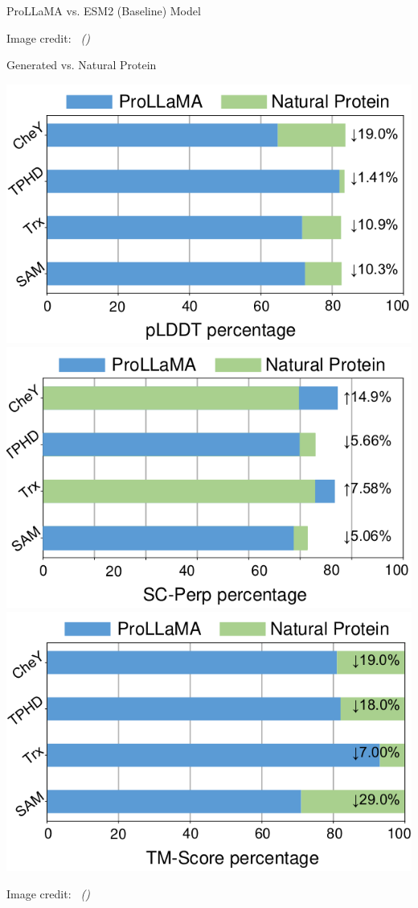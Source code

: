 \documentclass[dvipsnames,
hyperref={colorlinks,citecolor=black}
]{beamer}
\newcommand{\credit}[2]{\par\hfill \tiny #1 credit:~\itshape\citeauthor{#2} (\citeyear{#2})}
\begin{document}
\begin{frame}{ProLLaMA vs. ESM2 (Baseline) Model}
\begin{center}
	\end{center}
	\vspace{-1.4em}\credit{Image}{lv2024prollama}
\end{frame}

\begin{frame}{Generated vs. Natural Protein}
	\begin{center}
		\includegraphics[scale=0.7]{images/d.png}
		\includegraphics[scale=0.7]{images/e.png}
		\includegraphics[scale=0.7]{images/f.png}
	\end{center}
	\credit{Image}{lv2024prollama}
\end{frame}
\end{document}
